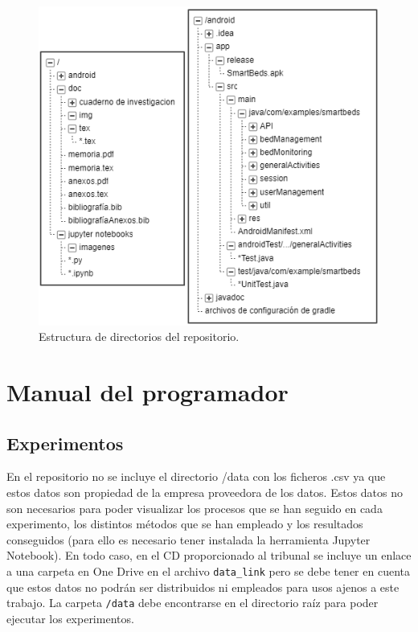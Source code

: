 \begin{figure}
	\centering
	\includegraphics[width=1\textwidth]{../img/directorios.png}
	\caption{Estructura de directorios del repositorio.}
	\label{fig:directorios}
\end{figure}

\section{Manual del programador}

\subsection{Experimentos} 

En el repositorio no se incluye el directorio /data con los ficheros .csv ya que estos datos son propiedad de la empresa proveedora de los datos. Estos datos no son necesarios para poder visualizar los procesos que se han seguido en cada experimento, los distintos métodos que se han empleado y los resultados conseguidos (para ello es necesario tener instalada la herramienta Jupyter Notebook). En todo caso, en el CD proporcionado al tribunal se incluye un enlace a una carpeta en One Drive en el archivo \texttt{data\_link} pero se debe tener en cuenta que estos datos no podrán ser distribuidos ni empleados para usos ajenos a este trabajo. La carpeta \texttt{/data} debe encontrarse en el directorio raíz para poder ejecutar los experimentos. 

